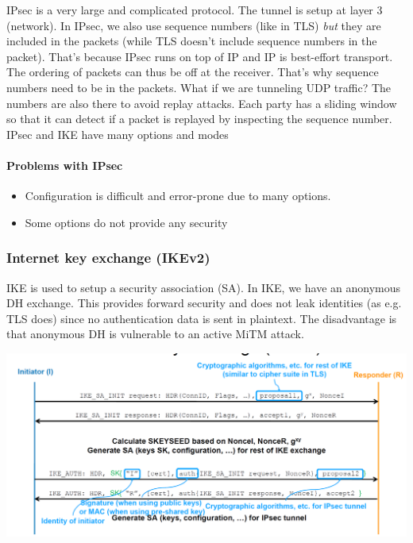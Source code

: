 IPsec is a very large and complicated protocol. The tunnel is setup at layer 3 (network). In IPsec, we also use sequence numbers (like in TLS) \textit{but} they are included in the packets (while TLS doesn't include sequence numbers in the packet). That's because IPsec runs on top of IP and IP is best-effort transport. The ordering of packets can thus be off at the receiver. That's why sequence numbers need to be in the packets. What if we are tunneling UDP traffic?
The numbers are also there to avoid replay attacks. Each party has a sliding window so that it can
detect if a packet is replayed by inspecting the sequence number. IPsec and IKE have many options and modes

\paragraph{Problems with IPsec}
\begin{itemize}
    \item Configuration is difficult and error-prone due to many options.
    \item Some options do not provide any security
\end{itemize}

\subsubsection{Internet key exchange (IKEv2)}

IKE is used to setup a security association (SA). In IKE, we have an anonymous DH exchange. This provides forward security and does not leak identities (as e.g. TLS does) since no authentication data is sent in plaintext. The disadvantage is that anonymous DH is vulnerable to an active MiTM attack.

\begin{minipage}{\linewidth}
    \centering      
    \includegraphics[width=\linewidth]{Figures/VPN_IKE.PNG} 
\end{minipage}

